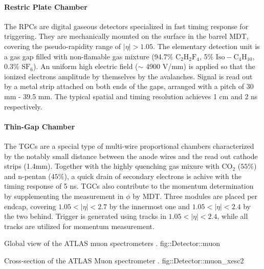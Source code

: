 \paragraph{Restric Plate Chamber}
The RPCs are digital gaseous detectors specialized in fast timing response for triggering.
They are mechanically mounted on the surface in the barrel MDT, covering the pseudo-rapidity range of $|\eta|>1.05$.
The elementary detection unit is a gas gap filled with non-flamable gas mixture (94.7$\%$ $\mathrm{C_2 H_2 F_4}$, 5$\%$ $\mathrm{Iso-C_4 H_10}$, 0.3$\%$ $\mathrm{SF_6}$). An uniform high electric field ($\sim$ 4900 V/mm) is applied so that the ionized electrons amplitude by themselves by the avalanches. Signal is read out by a metal strip attached on both ends of the gaps, arranged with a pitch of 30 mm - 39.5 mm.
The typical spatial and timing resolution achieves 1 cm and 2 ns respectively.



\paragraph{Thin-Gap Chamber}
The TGCs are a special type of multi-wire proportional chambers characterized by the notably small distance between the anode wires and the read out cathode strips (1.4mm).
Together with the highly quenching gas mixure with $\mathrm{CO_{2}}$ ($55\%$) and n-pentan ($45\%$), a quick drain of secondary electrons is achive with the timing response of 5 ns. TGCs also contribute to the momentum determination by supplementing the measurement in $\phi$ by MDT.
Three modules are placed per endcap, covering $1.05<|\eta|<2.7$ by the innermost one and $1.05<|\eta|<2.4$ by the two behind. Trigger is generated using tracks in $1.05<|\eta|<2.4$, while all tracks are utilized for momentum measurement.


{Global view of the ATLAS muon spectrometers \cite{ATLAS_exp}.}
{fig::Detector::muon}


{Cross-section of the ATLAS Muon spectrometer \cite{ATLAScosmicPerf}.}
{fig::Detector::muon_xesc2}



